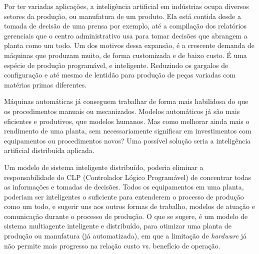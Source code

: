 \documentclass[
	article,			    %
	12pt,				    %
	oneside,			    %
	a4paper,			    %
	chapter=TITLE,		    %
	section=TITLE,		    %
	subsection=TITLE,	    %
	english,			    %
	brazil,				    %
	sumario=tradicional
]{abntex2}
\begin{document}
Por ter variadas aplicações, a inteligência artificial em indústrias ocupa diversos setores da produção, ou manufatura de um produto. Ela está contida desde a tomada de decisão de uma prensa por exemplo, até a compilação dos relatórios gerenciais que o centro administrativo usa para tomar decisões que abrangem a planta como um todo. Um dos motivos dessa expansão, é a crescente demanda de máquinas que produzam muito, de forma customizada e de baixo custo. É uma espécie de produção programável, e inteligente. Reduzindo os gargalos de configuração e até mesmo de lentidão para produção de peças variadas com matérias primas diferentes. 

Máquinas automáticas já conseguem trabalhar de forma mais habilidosa do que os procedimentos manuais ou mecanizados. Modelos automáticos já são mais eficientes e produtivos, que modelos humanos. Mas como melhorar ainda mais o rendimento de uma planta, sem necessariamente significar em investimentos com equipamentos ou procedimentos novos? Uma possível solução seria a inteligência artificial distribuída aplicada. 

Um modelo de sistema inteligente distribuído, poderia eliminar a responsabilidade do CLP (Controlador Lógico Programável) de concentrar todas as informações e tomadas de decisões. Todos os equipamentos em uma planta, poderiam ser inteligentes o suficiente para entenderem o processo de produção como um todo, e sugerir uns aos outros formas de trabalho, modelos de atuação e comunicação durante o processo de produção. O que se sugere, é um modelo de sistema multiagente inteligente e distribuído, para otimizar uma planta de produção ou manufatura (já automatizada), em que a limitação de \emph{hardware} já não permite mais progresso na relação custo vs. benefício de operação.




\end{document}
